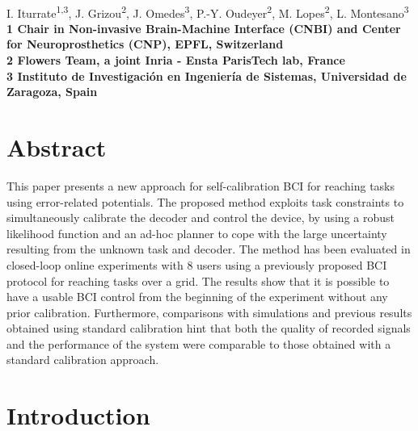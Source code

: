 \documentclass[10pt,letterpaper]{article}
\date{}
\begin{document}
\vspace*{0.35in}


\begin{flushleft}
{\Large
\textbf{}
}
\newline
\\
I. Iturrate\textsuperscript{1,3}, J. Grizou\textsuperscript{2}, J. Omedes\textsuperscript{3}, P.-Y. Oudeyer\textsuperscript{2}, M. Lopes\textsuperscript{2}, L. Montesano\textsuperscript{3}
\\
\bf{1} Chair in Non-invasive Brain-Machine Interface (CNBI) and Center for Neuroprosthetics (CNP), EPFL, Switzerland
\\
\bf{2} Flowers Team, a joint Inria - Ensta ParisTech lab, France
\\
\bf{3} Instituto de Investigaci\'{o}n en Ingenier\'{i}a de Sistemas, Universidad de Zaragoza, Spain
\\

\end{flushleft}

\section*{Abstract}
This paper presents a new approach for self-calibration BCI for reaching tasks using error-related potentials. The proposed method exploits task constraints to simultaneously calibrate the decoder and control the device, by using a robust likelihood function and an ad-hoc planner to cope with the large uncertainty resulting from the unknown task and decoder. The method has been evaluated in closed-loop online experiments with 8 users using a previously proposed BCI protocol for reaching tasks over a grid. The results show that it is possible to have a usable BCI control from the beginning of the experiment without any prior calibration. Furthermore, comparisons with simulations and previous results obtained using standard calibration hint that both the quality of recorded signals and the performance of the system were comparable to those obtained with a standard calibration approach. 


\linenumbers

\section{Introduction}
\label{sec:intro}
\end{document}

